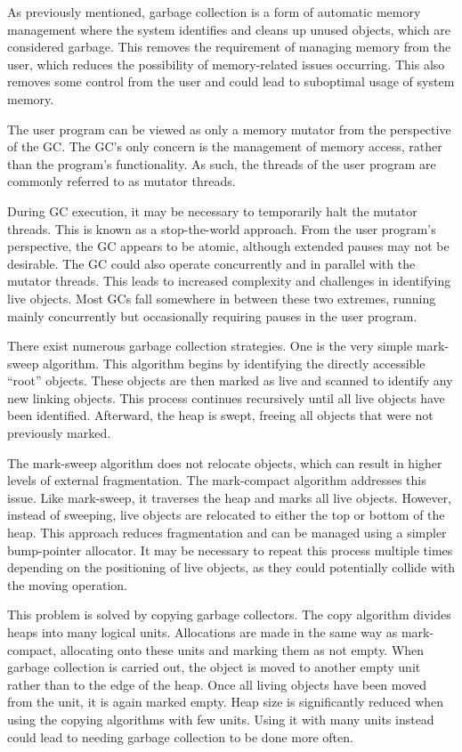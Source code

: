 As previously mentioned, garbage collection is a form of automatic memory management where the system identifies and cleans up unused objects, which are considered garbage. This removes the requirement of managing memory from the user, which reduces the possibility of memory-related issues occurring. This also removes some control from the user and could lead to suboptimal usage of system memory.

The user program can be viewed as only a memory mutator from the perspective of the GC. The GC's only concern is the management of memory access, rather than the program's functionality. As such, the threads of the user program are commonly referred to as mutator threads. 

During GC execution, it may be necessary to temporarily halt the mutator threads. This is known as a stop-the-world approach. From the user program's perspective, the GC appears to be atomic, although extended pauses may not be desirable. The GC could also operate concurrently and in parallel with the mutator threads. This leads to increased complexity and challenges in identifying live objects. Most GCs fall somewhere in between these two extremes, running mainly concurrently but occasionally requiring pauses in the user program.

There exist numerous garbage collection strategies. One is the very simple mark-sweep algorithm. This algorithm begins by identifying the directly accessible ``root'' objects. These objects are then marked as live and scanned to identify any new linking objects. This process continues recursively until all live objects have been identified. Afterward, the heap is swept, freeing all objects that were not previously marked.

The mark-sweep algorithm does not relocate objects, which can result in higher levels of external fragmentation. The mark-compact algorithm addresses this issue. Like mark-sweep, it traverses the heap and marks all live objects. However, instead of sweeping, live objects are relocated to either the top or bottom of the heap. This approach reduces fragmentation and can be managed using a simpler bump-pointer allocator. It may be necessary to repeat this process multiple times depending on the positioning of live objects, as they could potentially collide with the moving operation.

This problem is solved by copying garbage collectors. The copy algorithm divides heaps into many logical units. Allocations are made in the same way as mark-compact, allocating onto these units and marking them as not empty. When garbage collection is carried out, the object is moved to another empty unit rather than to the edge of the heap. Once all living objects have been moved from the unit, it is again marked empty. Heap size is significantly reduced when using the copying algorithms with few units. Using it with many units instead could lead to needing garbage collection to be done more often.

